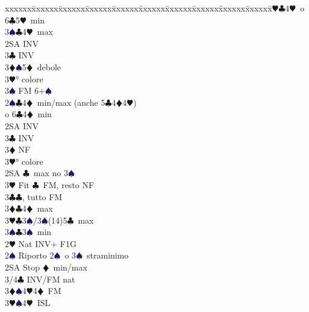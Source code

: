 \documentclass[a4paper,italian]{article}
\newcommand{\BC}{\textcolor{OliveGreen}{$\clubsuit$}}
\newcommand{\BD}{\textcolor{RedOrange}{$\vardiamondsuit$}}
\newcommand{\BH}{\textcolor{Red2}{$\varheartsuit${}}}
\newcommand{\BS}{\textcolor{MidnightBlue}{$\spadesuit${}}}
\newenvironment{bidtable}
{\begin{tabbing}

    xxxxxx\=xxxxxx\=xxxxxx\=xxxxxx\=xxxxxx\=xxxxxx\=xxxxxx\=xxxxxx\=xxxxxx\=xxxxxx\=\kill}
{\end{tabbing} }%
\begin{document}
\begin{multicols}{2}
\begin{bidtable}
                                        3\BH {}\BC 4\BH\ o 6\BC 5\BH\ min\\
                                        3\BS {}\BC 4\BH\ max\-\\
                                        2SA \> INV\\
                                        3\BC \> INV\\
                                        3\BD {}\BS 5\BD\ debole\\
                                        3\BH {}° colore\\
                                        3\BS \> FM 6+\BS\-\\
                                        2\BS {}\BC 4\BD\ min/max (anche 5\BC 4\BD 4\BH )\+\\
                                        o 6\BC 4\BD\ min\\
                                        2SA \> INV\\
                                        3\BC \> INV\\
                                        3\BD \> NF\\
                                        3\BH {}° colore\-\\
                                        2SA \BC\ max no 3\BS \+\\
                                        3\BH \> Fit \BC\ FM, resto NF\-\\
                                        3\BC {}\BC , tutto FM\\
                                        3\BD {}\BC 4\BD\ max\\
                                        3\BH {}\BC 3\BS /3\BS (14)5\BC\ max\\
                                        3\BS {}\BC 3\BS\ min\-\\
                                        2\BH \> Nat INV+ F1G\+\\
                                        2\BS \> Riporto 2\BS\ o 3\BS\ straminimo\\
                                        2SA \> Stop \BD\ min/max\+\\
                                        3/4\BC \> INV/FM nat\\
                                        3\BD {}\BS 4\BH 4\BD\ FM\\
                                        3\BH {}\BS 4\BH\ ISL\\

\end{bidtable}
\end{multicols}
\end{document}
